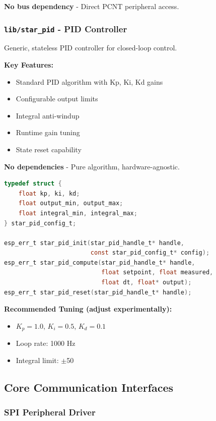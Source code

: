 \documentclass[11pt,letterpaper]{article}
\begin{document}
\textbf{No bus dependency} - Direct PCNT peripheral access.

\subsubsection{\texttt{lib/star\_pid} - PID Controller}

Generic, stateless PID controller for closed-loop control.

\textbf{Key Features:}
\begin{itemize}
    \item Standard PID algorithm with Kp, Ki, Kd gains
    \item Configurable output limits
    \item Integral anti-windup
    \item Runtime gain tuning
    \item State reset capability
\end{itemize}

\textbf{No dependencies} - Pure algorithm, hardware-agnostic.

\begin{lstlisting}[language=C, caption=PID Controller Interface]
typedef struct {
    float kp, ki, kd;
    float output_min, output_max;
    float integral_min, integral_max;
} star_pid_config_t;

esp_err_t star_pid_init(star_pid_handle_t* handle,
                        const star_pid_config_t* config);
esp_err_t star_pid_compute(star_pid_handle_t* handle,
                           float setpoint, float measured,
                           float dt, float* output);
esp_err_t star_pid_reset(star_pid_handle_t* handle);
\end{lstlisting}

\textbf{Recommended Tuning (adjust experimentally):}
\begin{itemize}
    \item $K_p = 1.0$, $K_i = 0.5$, $K_d = 0.1$
    \item Loop rate: 1000 Hz
    \item Integral limit: $\pm$50
\end{itemize}

\subsection{Core Communication Interfaces}

\subsubsection{SPI Peripheral Driver}
\end{document}
